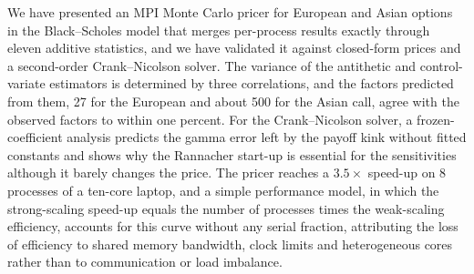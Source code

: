 \documentclass[11pt,a4paper]{article}
\begin{document}
We have presented an MPI Monte Carlo pricer for European and Asian options in the Black--Scholes model that merges per-process results exactly through eleven additive statistics, and we have validated it against closed-form prices and a second-order Crank--Nicolson solver.
The variance of the antithetic and control-variate estimators is determined by three correlations, and the factors predicted from them, 27 for the European and about 500 for the Asian call, agree with the observed factors to within one percent.
For the Crank--Nicolson solver, a frozen-coefficient analysis predicts the gamma error left by the payoff kink without fitted constants and shows why the Rannacher start-up is essential for the sensitivities although it barely changes the price.
The pricer reaches a $3.5\times$ speed-up on 8 processes of a ten-core laptop, and a simple performance model, in which the strong-scaling speed-up equals the number of processes times the weak-scaling efficiency, accounts for this curve without any serial fraction, attributing the loss of efficiency to shared memory bandwidth, clock limits and heterogeneous cores rather than to communication or load imbalance.
\end{document}
